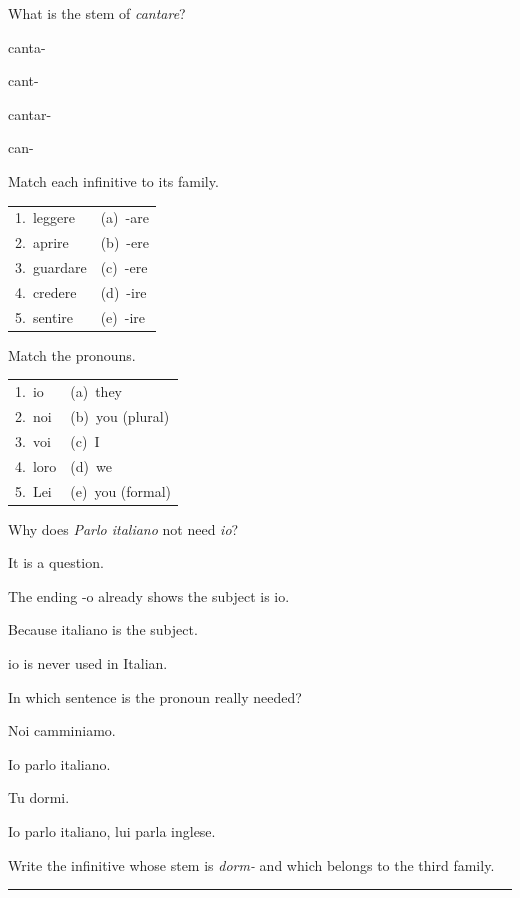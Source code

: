 \documentclass[11pt,a4paper,twoside,openright]{book}
\newcommand{\answerline}{\par\vspace{6pt}\noindent\rule{0.75\linewidth}{0.4pt}\par}
\begin{document}
\begin{exercises}
\item\label{ex:infinitives-pronouns-1}\relax What is the stem of \textit{cantare}?\par\nopagebreak\begin{options}
\item\relax canta-
\item\relax cant-
\item\relax cantar-
\item\relax can-
\end{options}
\item\label{ex:infinitives-pronouns-2}\relax Match each infinitive to its family.\par\smallskip\begin{tabularx}{\linewidth}{@{}L L@{}}
1.\ leggere & (a)\ -are \\
2.\ aprire & (b)\ -ere \\
3.\ guardare & (c)\ -ere \\
4.\ credere & (d)\ -ire \\
5.\ sentire & (e)\ -ire \\
\end{tabularx}
\item\label{ex:infinitives-pronouns-3}\relax Match the pronouns.\par\smallskip\begin{tabularx}{\linewidth}{@{}L L@{}}
1.\ io & (a)\ they \\
2.\ noi & (b)\ you (plural) \\
3.\ voi & (c)\ I \\
4.\ loro & (d)\ we \\
5.\ Lei & (e)\ you (formal) \\
\end{tabularx}
\item\label{ex:infinitives-pronouns-4}\relax Why does \textit{Parlo italiano} not need \textit{io}?\par\nopagebreak\begin{options}
\item\relax It is a question.
\item\relax The ending -o already shows the subject is io.
\item\relax Because italiano is the subject.
\item\relax io is never used in Italian.
\end{options}
\item\label{ex:infinitives-pronouns-5}\relax In which sentence is the pronoun really needed?\par\nopagebreak\begin{options}
\item\relax Noi camminiamo.
\item\relax Io parlo italiano.
\item\relax Tu dormi.
\item\relax Io parlo italiano, lui parla inglese.
\end{options}
\item\label{ex:infinitives-pronouns-6}\relax Write the infinitive whose stem is \textit{dorm-} and which belongs to the third family.\par\answerline
\end{exercises}
\end{document}
